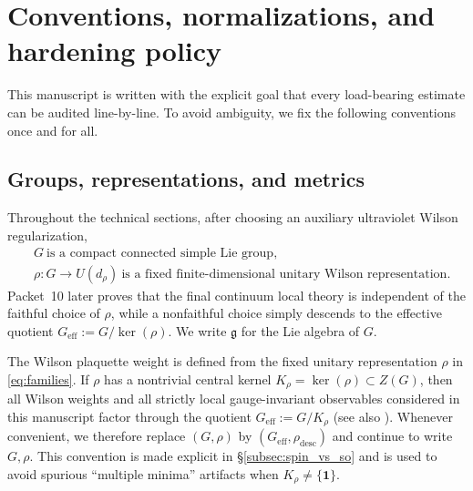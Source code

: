 \section{Conventions, normalizations, and hardening policy}
\label{sec:conventions}

This manuscript is written with the explicit goal that every load-bearing estimate can be audited line-by-line.
To avoid ambiguity, we fix the following conventions once and for all.

\subsection{Groups, representations, and metrics}
\label{subsec:conventions_groups}

Throughout the technical sections, after choosing an auxiliary ultraviolet Wilson regularization,
\begin{equation}
\label{eq:families}
\begin{aligned}
&G\ \text{is a compact connected simple Lie group},\\
&\rho:G\to U(d_\rho)\ \text{is a fixed finite-dimensional unitary Wilson representation}.
\end{aligned}
\end{equation}
Packet~10 later proves that the final continuum local theory is independent of the faithful choice of $\rho$, while a nonfaithful choice simply descends to the effective quotient $G_{\mathrm{eff}}:=G/\ker(\rho)$.
We write $\mathfrak g$ for the Lie algebra of $G$.

\begin{remark}
\label{rem:effective_group_convention}
The Wilson plaquette weight is defined from the fixed unitary representation $\rho$ in \eqref{eq:families}.
If $\rho$ has a nontrivial central kernel $K_\rho=\ker(\rho)\subset Z(G)$, then all Wilson weights and all strictly local gauge-invariant observables
considered in this manuscript factor through the quotient $G_{\mathrm{eff}}:=G/K_\rho$ (see also ).
Whenever convenient, we therefore replace $(G,\rho)$ by $(G_{\mathrm{eff}},\rho_{\mathrm{desc}})$ and continue to write $G,\rho$.
This convention is made explicit in \S\ref{subsec:spin_vs_so} and is used to avoid spurious ``multiple minima'' artifacts when $K_\rho\neq\{\mathbf 1\}$.
\end{remark}

